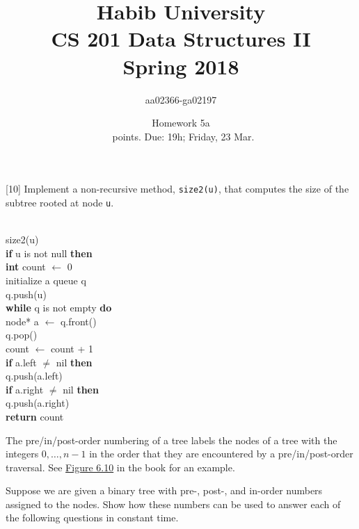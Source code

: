 \documentclass[addpoints]{exam}
\title{Habib University\\CS 201 Data Structures II\\Spring 2018}
\author{aa02366-ga02197}  %
\date{Homework 5a\\\numpoints\ points. Due: 19h; Friday, 23 Mar.}
\begin{document}
\maketitle

\begin{questions}

  [10]
  Implement a non-recursive method, {\tt size2(u)}, that computes
  the size of the subtree rooted at node {\tt u}.
  \begin{solution}
    \\
    size2(u)\\
    \tabto{5mm} \textbf{if} u is not null \textbf{then}\\
    \tabto{10mm} \textbf{int} count $\leftarrow$ 0\\
    \tabto{10mm} initialize a queue q\\
    \tabto{10mm} q.push(u)\\
    \tabto{10mm} \textbf{while} q is not empty \textbf{do}\\
    \tabto{15mm} node* a $\leftarrow$ q.front()\\
    \tabto{15mm} q.pop()\\    
    \tabto{15mm} count $\leftarrow$ count + 1\\
    \tabto{15mm} \textbf{if} a.left $\neq$ nil \textbf{then}\\ 
    \tabto{20mm} q.push(a.left)\\
    \tabto{15mm} \textbf{if} a.right $\neq$ nil \textbf{then}\\ 
    \tabto{20mm} q.push(a.right)\\
    \tabto{10mm} \textbf{return} count
  \end{solution}

  The pre/in/post-order numbering of a tree labels the nodes of a tree with the integers $0,\ldots,n − 1$ in the order that they are encountered by a pre/in/post-order traversal. See \href{http://opendatastructures.org/ods-python/6_3_Discussion_Exercises.html#fig:binarytree-numbering}{Figure 6.10} in the book for an example.

  Suppose we are given a binary tree with pre-, post-, and in-order numbers assigned to the nodes. Show how these numbers can be used to answer each of the following questions in constant time.
  \begin{parts}

\end{parts}
\end{questions}
\end{document}
